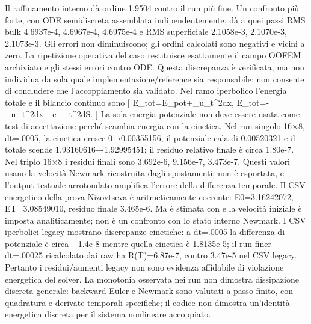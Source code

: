 {} Il raffinamento interno  dà ordine 1.9504 contro il run più fine. Un confronto più forte, con ODE semidiscreta assemblata indipendentemente, dà a quei passi RMS bulk 4.6937e-4, 4.6967e-4, 4.6975e-4 e RMS superficiale 2.1058e-3, 2.1070e-3, 2.1073e-3. Gli errori non diminuiscono; gli ordini calcolati sono negativi e vicini a zero. La ripetizione operativa del caso restituisce esattamente il campo OOFEM archiviato e gli stessi errori contro ODE. Questa discrepanza è verificata, ma non individua da sola quale implementazione/reference sia responsabile; non consente di concludere che l’accoppiamento sia validato.\markdownRendererInterblockSeparator
{}
\markdownRendererSectionEnd \markdownRendererSectionBegin
{}\markdownRendererInterblockSeparator
{}Nel ramo iperbolico l’energia totale e il bilancio continuo sono\markdownRendererInterblockSeparator
{}[ E_{tot}=E_{pot}+\int_\Omega{}u_t^2dx, \qquad \dot E_{tot}=-\int_\Omega\rho\zeta u_t^2dx-\int_\Gamma c_\Gamma\psi_t^2dS. ]\markdownRendererInterblockSeparator
{}La sola energia potenziale non deve essere usata come test di accettazione perché scambia energia con la cinetica. Nel run singolo 16×8, dt=.0005, la cinetica cresce 0→0.00355156, il potenziale cala di 0.00520321 e il totale scende 1.93160616→1.92995451; il residuo relativo finale è circa 1.80e-7. Nel triplo 16×8 i residui finali sono 3.692e-6, 9.156e-7, 3.473e-7. Questi valori usano la velocità Newmark ricostruita dagli spostamenti;  non è esportata, e l’output testuale arrotondato amplifica l’errore della differenza temporale.\markdownRendererInterblockSeparator
{}Il CSV energetico della prova Nizovtseva è aritmeticamente coerente: E0=3.16242072, ET=3.08549010, residuo finale 3.465e-6. Ma  è stimata con  e la velocità iniziale è imposta analiticamente; non è un confronto con lo stato interno Newmark. I CSV iperbolici legacy mostrano discrepanze cinetiche: a dt=.0005 la differenza di potenziale è circa −1.4e-8 mentre quella cinetica è 1.8135e-5; il run finer dt=.00025 ricalcolato dai raw ha R(T)=6.87e-7, contro 3.47e-5 nel CSV legacy. Pertanto i residui/aumenti legacy non sono evidenza affidabile di violazione energetica del solver.\markdownRendererInterblockSeparator
{}La monotonia osservata nei run non dimostra dissipazione discreta generale: backward Euler e Newmark sono valutati a passo finito, con quadratura e derivate temporali specifiche; il codice non dimostra un’identità energetica discreta per il sistema nonlineare accoppiato.\markdownRendererInterblockSeparator
